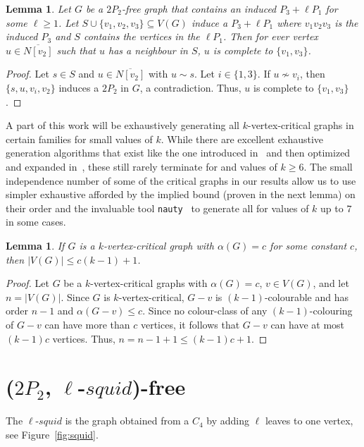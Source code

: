 \documentclass[11pt]{article}
\newtheorem{lemma}[theorem]{Lemma}
\theoremstyle{definition}
\newcommand{\squid}[1]{$#1$-$squid$}
\begin{document}
\begin{lemma}\label{lem:2P2freeneighboursofS}
Let $G$ be a $2P_2$-free graph that contains an induced $P_3+\ell P_1$ for some $\ell\ge 1$. Let $S\cup\{v_1,v_2,v_3\}\subseteq V(G)$ induce a $P_3+\ell P_1$ where $v_1v_2v_3$ is the induced $P_3$ and $S$ contains the vertices in the $\ell P_1$. Then for ever vertex $u\in \overline{N[v_2]}$ such that $u$ has a neighbour in $S$, $u$ is complete to $\{v_1,v_3\}$. 
\end{lemma}
\begin{proof}
Let $s\in S$ and $u\in \overline{N[v_2]}$ with $u\sim s$. Let $i\in \{1,3\}$. If $u\nsim v_i$, then $\{s,u,v_i,v_2\}$ induces a $2P_2$ in $G$, a contradiction. Thus, $u$ is complete to $\{v_1,v_3\}$.
\end{proof}



A part of this work will be exhaustively generating all $k$-vertex-critical graphs in certain families for small values of $k$. While there are excellent exhaustive generation algorithms that exist like the one introduced in~\cite{Hoang2015} and then optimized and expanded in~\cite{GoedgebeurSchaudt2018}, these still rarely terminate for and values of $k\ge 6$. The small independence number of some of the critical graphs in our results allow us to use simpler exhaustive afforded by the implied bound (proven in the next lemma) on their order and the invaluable tool \texttt{nauty}~\cite{nauty} to generate all for values of $k$ up to $7$ in some cases.

\begin{lemma}\label{lem:kcritindnumboundonorder}
If $G$ is a $k$-vertex-critical graph with $\alpha(G)=c$ for some constant $c$, then $|V(G)|\le c(k-1)+1$.
\end{lemma}
\begin{proof}
Let $G$ be a $k$-vertex-critical graphs with $\alpha(G)=c$, $v\in V(G)$, and let $n=|V(G)|$. Since $G$ is $k$-vertex-critical, $G-v$ is $(k-1)$-colourable and has order $n-1$ and $\alpha(G-v)\le c$. Since no colour-class of any $(k-1)$-colouring of $G-v$ can have more than $c$ vertices, it follows that $G-v$ can have at most $(k-1)c$ vertices. Thus, $n=n-1+1 \le (k-1)c+1$.
\end{proof}


\section{($2P_2$, \squid{\ell})-free}
The \squid{\ell}  is the graph obtained from a $C_4$ by adding $\ell$ leaves to one vertex, see Figure~\ref{fig:squid}.
\end{document}
